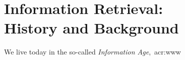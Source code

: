 
\chapter[Information Retrieval]{Information Retrieval:\\History and Background}\label{chap:ir_background}
We live today in the so-called \emph{Information Age},~\gls{acr:www}
